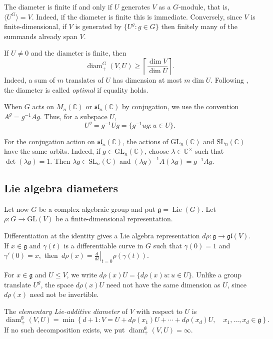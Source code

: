 \documentclass[11pt]{article}
\theoremstyle{remark}
\newcommand{\C}{\mathbb C}
\begin{document}
The diameter is finite if and only if $U$ generates $V$ as a $G$-module,
that is, $\langle U^G\rangle=V.$
Indeed, if the diameter is finite this is immediate.  Conversely, since
$V$ is finite-dimensional, if $V$ is generated by $\{U^g: g \in G\}$
then finitely many of the summands already span $V$.

If $U\neq0$ and the diameter is finite, then
\[
 \operatorname{diam}^{G}_{+}(V,U)
 \geq
 \left\lceil\frac{\dim V}{\dim U}\right\rceil.
\]
Indeed, a sum of $m$ translates of $U$ has dimension at most
$m\dim U$.  Following \cite{JezernikSpenko}, the diameter is called
\emph{optimal} if equality holds.

When $G$ acts on $M_n(\C)$ or $\mathfrak{sl}_n(\C)$ by conjugation, we use
the convention $A^g=g^{-1}Ag.$
Thus, for a subspace $U$,
\[
 U^g=g^{-1}Ug
 =
 \{g^{-1}ug:u\in U\}.
\]

For the conjugation action on $\mathfrak{sl}_n(\C)$, the actions of
$\mathrm{GL}_n(\C)$ and $\mathrm{SL}_n(\C)$ have the same orbits.
Indeed, if $g\in\mathrm{GL}_n(\C)$, choose $\lambda\in\C^\times$ such that $\det(\lambda g)=1.$
Then $\lambda g\in\mathrm{SL}_n(\C)$ and $(\lambda g)^{-1}A(\lambda g)=g^{-1}Ag.$

\subsection{Lie algebra diameters}

Let now $G$ be a complex algebraic group and put $\mathfrak g=\operatorname{Lie}(G).$
Let $\rho:G\longrightarrow\mathrm{GL}(V)$
be a finite-dimensional representation.  

Differentiation at the identity
gives a Lie algebra representation $d\rho:\mathfrak g\longrightarrow\mathfrak{gl}(V).$ If $x\in\mathfrak g$ and $\gamma(t)$ is a differentiable curve in $G$
such that $\gamma(0)=1$ and $\gamma'(0)=x,$
\hbox{then $d\rho(x)
 =
 \left.\frac{d}{dt}\right|_{t=0}\rho(\gamma(t)).$}

For $x\in\mathfrak g$ and $U\leq V$, we write $d\rho(x)U
 =
 \{d\rho(x)u:u\in U\}.$
Unlike a group translate $U^g$, the space $d\rho(x)U$ need not have the
same dimension as $U$, since $d\rho(x)$ need not be invertible.

The \emph{elementary Lie-additive diameter} of $V$ with respect to $U$ is
\[
 \operatorname{diam}^{\mathfrak g}_{+}(V,U)
 =
 \min\left\{
 d+1:
 V=
 U+d\rho(x_1)U+\cdots+d\rho(x_d)U,
 \quad
 x_1,\ldots,x_d\in\mathfrak g
 \right\}.
\]
If no such decomposition exists, we put $\operatorname{diam}^{\mathfrak g}_{+}(V,U)=\infty.$
\end{document}
